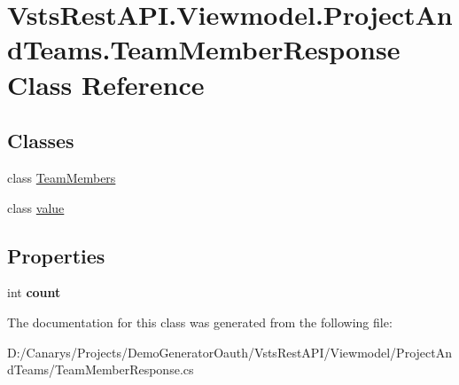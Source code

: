 \hypertarget{class_vsts_rest_a_p_i_1_1_viewmodel_1_1_project_and_teams_1_1_team_member_response}{}\section{Vsts\+Rest\+A\+P\+I.\+Viewmodel.\+Project\+And\+Teams.\+Team\+Member\+Response Class Reference}
\label{class_vsts_rest_a_p_i_1_1_viewmodel_1_1_project_and_teams_1_1_team_member_response}
\subsection*{Classes}
\begin{DoxyCompactItemize}
\item 
class \mbox{\hyperlink{class_vsts_rest_a_p_i_1_1_viewmodel_1_1_project_and_teams_1_1_team_member_response_1_1_team_members}{Team\+Members}}
\item 
class \mbox{\hyperlink{class_vsts_rest_a_p_i_1_1_viewmodel_1_1_project_and_teams_1_1_team_member_response_1_1value}{value}}
\end{DoxyCompactItemize}
\subsection*{Properties}
\begin{DoxyCompactItemize}
\item 
\mbox{\label{class_vsts_rest_a_p_i_1_1_viewmodel_1_1_project_and_teams_1_1_team_member_response_ac8fa9b94da46315d6e811a46524da3bf}} 
int {\bfseries count}
\end{DoxyCompactItemize}


The documentation for this class was generated from the following file\+:\begin{DoxyCompactItemize}
\item 
D\+:/\+Canarys/\+Projects/\+Demo\+Generator\+Oauth/\+Vsts\+Rest\+A\+P\+I/\+Viewmodel/\+Project\+And\+Teams/Team\+Member\+Response.\+cs\end{DoxyCompactItemize}
